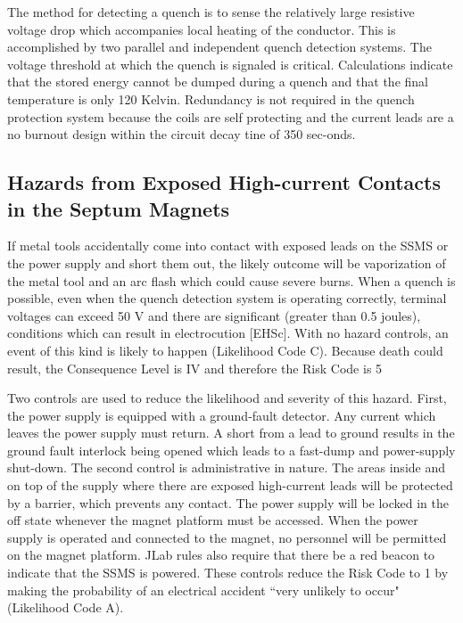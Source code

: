 The method for detecting a quench is to sense the relatively large resistive 
voltage drop which accompanies local heating of the conductor.  This is accomplished by two parallel and 
independent quench detection systems.  The voltage threshold at which the quench is signaled is critical.  
Calculations indicate that  the stored energy cannot be dumped during a quench and that the final temperature 
is only 120 Kelvin. Redundancy is not required in the quench protection system because the coils are self 
protecting and the current leads are a no burnout design within the circuit decay tine of 350 sec-onds.


\begin{safetyen}{10}{15}
\subsection {\bf Hazards from Exposed High-current Contacts in the Septum Magnets}
\end{safetyen}

If metal tools accidentally come into contact with exposed leads on the SSMS or the power supply and short 
them out, the likely outcome will be vaporization of the metal tool and an arc flash which could cause 
severe burns.  When a quench is possible, even when the quench detection system is operating correctly, 
terminal voltages can exceed 50 V and there are significant (greater than 0.5 joules), conditions which 
can result in 
electrocution [EHSc].  With no hazard controls, an event of this kind is likely to happen (Likelihood Code C).  
Because death could result, the Consequence Level is IV and therefore the Risk Code is 5

Two controls are used to reduce the likelihood and severity of this hazard.  First, the power supply is equipped 
with a ground-fault detector.  Any current which leaves the power supply must return.  A short from a lead to 
ground results in the ground fault interlock being opened which leads to a fast-dump and power-supply shut-down.  
The second control is administrative in nature.  The areas inside and on top of the supply where there are exposed 
high-current leads will be protected by a barrier, which prevents any contact.  The power supply will be locked in 
the off state whenever the magnet platform must be accessed.  When the power supply is operated and connected to 
the magnet, no personnel will be permitted on the magnet platform. JLab rules also require that there be a red 
beacon to indicate that the SSMS is powered.  These controls reduce the Risk Code to 1 by making the probability 
of an electrical accident ``very unlikely to occur" (Likelihood Code A).

